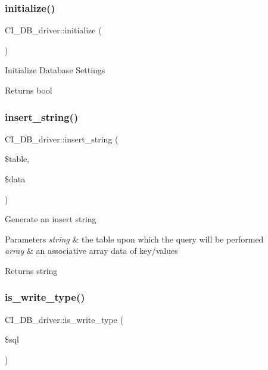 \subsubsection{\texorpdfstring{initialize()}{initialize()}}
{\footnotesize\ttfamily C\+I\+\_\+\+D\+B\+\_\+driver\+::initialize (\begin{DoxyParamCaption}{ }\end{DoxyParamCaption})}

Initialize Database Settings

\begin{DoxyReturn}{Returns}
bool 
\end{DoxyReturn}
\mbox{\label{class_c_i___d_b__driver_aa851138452d2b56e3034be3daf9949e1}} 
\subsubsection{\texorpdfstring{insert\+\_\+string()}{insert\_string()}}
{\footnotesize\ttfamily C\+I\+\_\+\+D\+B\+\_\+driver\+::insert\+\_\+string (\begin{DoxyParamCaption}\item[{}]{\$table,  }\item[{}]{\$data }\end{DoxyParamCaption})}

Generate an insert string


\begin{DoxyParams}{Parameters}
{\em string} & the table upon which the query will be performed \\
\hline
{\em array} & an associative array data of key/values \\
\hline
\end{DoxyParams}
\begin{DoxyReturn}{Returns}
string 
\end{DoxyReturn}
\mbox{\label{class_c_i___d_b__driver_a52dd9f1efc9f146590851f340070ba94}} 
\subsubsection{\texorpdfstring{is\+\_\+write\+\_\+type()}{is\_write\_type()}}
{\footnotesize\ttfamily C\+I\+\_\+\+D\+B\+\_\+driver\+::is\+\_\+write\+\_\+type (\begin{DoxyParamCaption}\item[{}]{\$sql }\end{DoxyParamCaption})}

